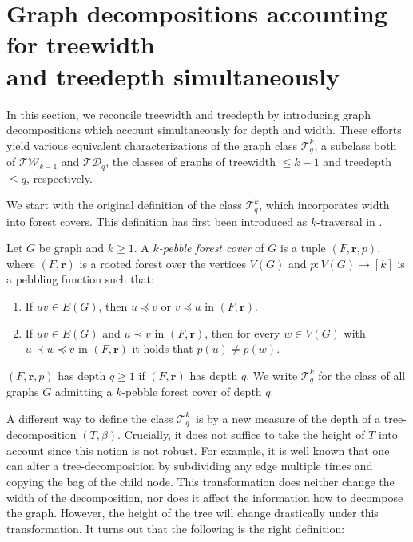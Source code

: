 \documentclass{lmcs}
\theoremstyle{plain}\newtheorem{claim}[thm]{Claim}   %
\newcommand{\cT}{\ensuremath{\mathcal T}}
\newcommand{\TW}{\ensuremath{\mathcal{TW}}}
\newcommand{\TD}{\ensuremath{\mathcal{TD}}}
\newcommand{\Ekq}{\ensuremath{\cT_{q}^{k}}}
\renewcommand{\vec}[1]{\ensuremath{\boldsymbol{#1}}}
\begin{document}
\section{Graph decompositions accounting for treewidth\texorpdfstring{\\}{} and treedepth simultaneously}
\label{sec:deep-wide-graph-dec}
In this section, we reconcile treewidth and treedepth by introducing graph decompositions which account simultaneously for depth and width.
These efforts yield various equivalent characterizations of the graph class $\Ekq$, a subclass both of $\TW_{k-1}$ and $\TD_q$, the classes of graphs of treewidth $\leq k -1$ and treedepth $\leq q$, respectively.

We start with the original definition of the class \Ekq, which incorporates width into forest covers.
This definition has first been introduced as $k$-traversal in \cite{Abramsky_pebbling_2017}.

\begin{defi}
	\label{def:kpebbleforest}
	Let $G$ be  graph and $k\geq 1$.
	A \emph{$k$-pebble forest cover} of $G$ is a tuple $(F,\vec{r},p)$, where $(F,\vec{r})$ is a rooted forest over the vertices $V(G)$ and $p\colon V(G)\rightarrow [k]$ is a pebbling function such that:
	\begin{enumerate}[label=(FC.\arabic*), labelindent=0pt, itemindent=*, leftmargin=*]
		\item \label{ax:pebble-forest-edges} If $uv\in E(G)$, then $u\preceq v$ or $v\preceq u$ in $(F,\vec{r})$.
		\item \label{ax:pebble-forest-pebble} If $uv \in E(G)$ and $u\prec v$ in $(F,\vec{r})$, then for every $w\in V(G)$ with $u\prec w\preceq v$ in $(F,\vec{r})$ it holds that $p(u)\neq p(w)$.
	\end{enumerate}
	$(F,\vec{r},p)$ has depth $q\geq 1$ if $(F,\vec{r})$ has depth $q$.
	We write $\Ekq$ for the class of all graphs $G$ admitting a $k$-pebble forest cover of depth $q$.
\end{defi}

A different way to define the class \Ekq\ is by a new measure of the depth of a tree-decomposition $(T, \beta)$.
Crucially, it does not suffice to take the height of $T$ into account since this notion is not robust.
For example, it is well known that one can alter a tree-decomposition by subdividing any edge multiple times and copying the bag of the child node.
This transformation does neither change the width of the decomposition, nor does it affect the information how to decompose the graph. However, the height of the tree will change drastically under this transformation.
It turns out that the following is the right definition:
\end{document}
